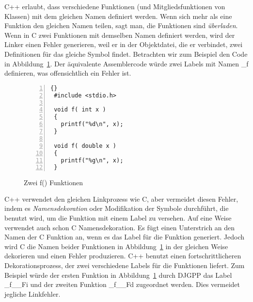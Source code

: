 \label{sec:mangling} C++ erlaubt, dass verschiedene Funktionen (und
Mitgliedsfunktionen von Klassen) mit dem gleichen Namen definiert
werden. Wenn sich mehr als eine Funktion den gleichen Namen teilen,
sagt man, die Funktionen sind \emph{\"{u}berladen}. Wenn in C zwei
Funktionen mit demselben Namen definiert werden, wird der Linker
einen Fehler generieren, weil er in der Objektdatei, die er
verbindet, zwei Definitionen f\"{u}r das gleiche Symbol findet.
Betrachten wir zum Beispiel den Code in Abbildung~\ref{fig:twof}.
Der \"{a}quivalente Assemblercode w\"{u}rde zwei Labels mit Namen {\code
\_f} definieren, was offensichtlich ein Fehler ist.

\begin{figure}[ht]
\centering
\begin{lstlisting}[frame=tlrb, numbers=left]{}
 #include <stdio.h>

 void f( int x )
 {
   printf("%d\n", x);
 }

 void f( double x )
 {
   printf("%g\n", x);
 }
\end{lstlisting}
\caption{Zwei {\code f()} Funktionen \label{fig:twof}}
\end{figure}

C++ verwendet den gleichen Linkprozess wie C, aber vermeidet diesen
Fehler, indem es \emph{Namensdekoration} oder Modifikation der
Symbole durch\-f\"{u}hrt, die benutzt wird, um die Funktion mit einem
Label zu versehen. Auf eine Weise verwendet auch schon C
Namensdekoration. Es f\"{u}gt einen Unterstrich an den Namen der C
Funktion an, wenn es das Label f\"{u}r die Funktion generiert. Jedoch
wird C die Namen beider Funktionen in Abbildung~\ref{fig:twof} in
der gleichen Weise dekorieren und einen Fehler produzieren. C++
benutzt einen fortschrittlicheren Dekorationsprozess, der zwei
verschiedene Labels f\"{u}r die Funktionen liefert. Zum Beispiel w\"{u}rde
der ersten Funktion in Abbildung~\ref{fig:twof} durch DJGPP
 das Label {\code \_f\_\_Fi} und der zweiten
Funktion {\code \_f\_\_Fd} zugeordnet werden. Dies vermeidet
jegliche Linkfehler.

